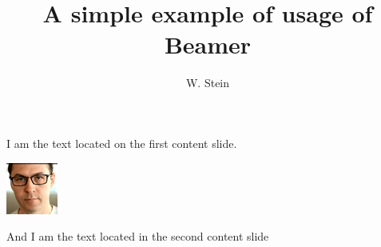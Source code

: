 \documentclass{beamer}
\title{A simple example of usage of Beamer}
\author{W. Stein}\institute{University of Washington}
\begin{document}
\begin{frame}
\titlepage

\end{frame}

\begin{frame}
I am the text located on the first content slide.

\begin{center}
\includegraphics{wstein64}
\end{center}
\end{frame}

\begin{frame}
And I am the text located in the second content slide
\end{frame}
\end{document}
